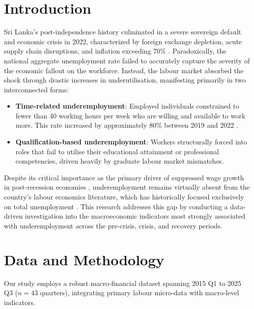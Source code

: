 \documentclass[sigconf]{acmart}
\begin{document}
\maketitle

\section{Introduction}

Sri Lanka's post-independence history culminated in a severe sovereign default and economic crisis in 2022, characterized by foreign exchange depletion, acute supply chain disruptions, and inflation exceeding 70\% \cite{cbsl2025}. Paradoxically, the national aggregate unemployment rate failed to accurately capture the severity of the economic fallout on the workforce. Instead, the labour market absorbed the shock through drastic increases in underutilisation, manifesting primarily in two interconnected forms:
\begin{itemize}
    \item \textbf{Time-related underemployment}: Employed individuals constrained to fewer than 40 working hours per week who are willing and available to work more. This rate increased by approximately 80\% between 2019 and 2022 \cite{dcs2025}.
    \item \textbf{Qualification-based underemployment}: Workers structurally forced into roles that fail to utilise their educational attainment or professional competencies, driven heavily by graduate labour market mismatches.
\end{itemize}

Despite its critical importance as the primary driver of suppressed wage growth in post-recession economies \cite{bell2018underemployment}, underemployment remains virtually absent from the country's labour economics literature, which has historically focused exclusively on total unemployment \cite{pabasara2025impact}. This research addresses this gap by conducting a data-driven investigation into the macroeconomic indicators most strongly associated with underemployment across the pre-crisis, crisis, and recovery periods. 

\section{Data and Methodology}

Our study employs a robust macro-financial dataset spanning 2015 Q1 to 2025 Q3 ($n=43$ quarters), integrating primary labour micro-data with macro-level indicators.
\end{document}
